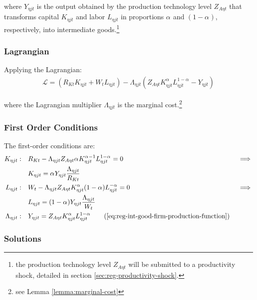 \documentclass[../thesis.tex]{subfiles}
\begin{document}
where $Y_{\eta jt}$ is the output obtained by the production technology level $Z_{A\eta t}$ that transforms capital $K_{\eta jt}$ and labor $L_{\eta jt}$ in proportions ${\alpha_{}}$ and $(1-{\alpha_{}})$, respectively, into intermediate goods.\footnote{the production technology level $Z_{A\eta t}$ will be submitted to a productivity shock, detailed in section \ref{sec:reg-productivity-shock}.}

\subsubsection*{Lagrangian}

Applying the Lagrangian:
\begin{align}
	\label{eq:reg-int-good-firm-lagrangian}
	\mathcal{L} = (R_{Kt} K_{\eta jt} + W_t L_{\eta jt}) - \Lambda_{\eta jt} (Z_{A\eta t} K_{\eta jt}^{\alpha_{}} L_{\eta jt}^{1-{\alpha_{}}} - Y_{\eta jt})
\end{align}

where the Lagrangian multiplier $\Lambda_{\eta jt}$ is the marginal cost.\footnote{see Lemma \ref{lemma:marginal-cost}}

\subsubsection*{First Order Conditions}

The first-order conditions are:
\begin{alignat}{2}
	K_{\eta jt}: \quad & R_{Kt} - \Lambda_{\eta jt} Z_{A\eta t} {\alpha_{}} K_{\eta jt}^{{\alpha_{}}-1} L_{\eta jt}^{1-{\alpha_{}}} = 0 &&\implies \nonumber \\
	& K_{\eta jt} = {\alpha_{}} Y_{\eta jt} \frac{\Lambda_{\eta jt}}{R_{Kt}} \label{eq:reg-int-good-firm-FOC-Kt} \\
	L_{\eta jt}: \quad & W_t - \Lambda_{\eta jt} Z_{A\eta t} K_{\eta jt}^{\alpha_{}} (1-{\alpha_{}}) L_{\eta jt}^{-{\alpha_{}}} = 0 \quad &&\implies \nonumber \\ 
	& L_{\eta jt} = (1-{\alpha_{}}) Y_{\eta jt} \frac{\Lambda_{\eta jt}}{W_t} \label{eq:reg-int-good-firm-FOC-Lt} \\
	\Lambda_{\eta jt}: \quad & Y_{\eta jt} = Z_{A\eta t} K_{\eta jt}^{\alpha_{}} L_{\eta jt}^{1-{\alpha_{}}} \tag{\ref{eq:reg-int-good-firm-production-function}}
\end{alignat}

\subsubsection*{Solutions}
\end{document}
